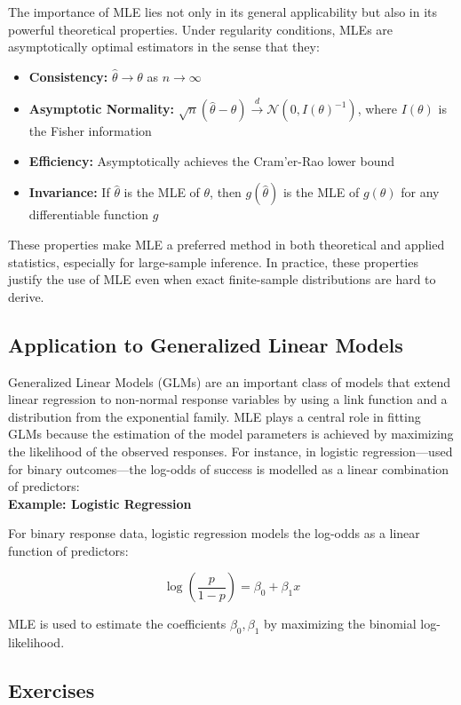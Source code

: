 \documentclass{book}
\begin{document}
The importance of MLE lies not only in its general applicability but also in its powerful theoretical properties. 
Under regularity conditions, MLEs are asymptotically optimal estimators in the sense that they:
\begin{itemize}
\item \textbf{Consistency:} $\hat{\theta} \to \theta$ as $n \to \infty$
\item \textbf{Asymptotic Normality:} $\sqrt{n}(\hat{\theta} - \theta) \xrightarrow{d} \mathcal{N}(0, I(\theta)^{-1})$, where $I(\theta)$ is the Fisher information
\item \textbf{Efficiency:} Asymptotically achieves the Cram'er-Rao lower bound
\item \textbf{Invariance:} If $\hat{\theta}$ is the MLE of $\theta$, then $g(\hat{\theta})$ is the MLE of $g(\theta)$ for any differentiable function $g$
\end{itemize}
These properties make MLE a preferred method in both theoretical and applied statistics, especially for large-sample inference. 
In practice, these properties justify the use of MLE even when exact finite-sample distributions are hard to derive.

\subsection{Application to Generalized Linear Models}

Generalized Linear Models (GLMs) are an important class of models that extend linear regression to non-normal response variables by using a link function and a distribution from the exponential family. MLE plays a central role in fitting GLMs because the estimation of the model parameters is achieved by maximizing the likelihood of the observed responses.
For instance, in logistic regression---used for binary outcomes---the log-odds of success is modelled as a linear combination of predictors:\\

\textbf{Example: Logistic Regression}

For binary response data, logistic regression models the log-odds as a linear function of predictors:

\[
\log\left( \frac{p}{1 - p} \right) = \beta_0 + \beta_1 x
\]

MLE is used to estimate the coefficients $\beta_0, \beta_1$ by maximizing the binomial log-likelihood.

\newpage

\subsection*{Exercises}
\end{document}
